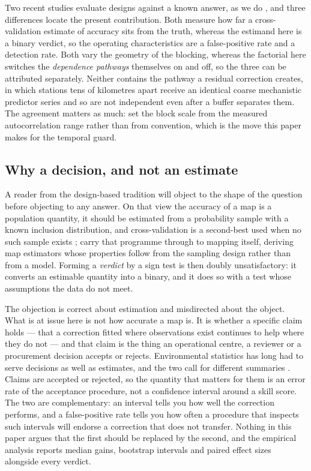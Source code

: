 Two recent studies evaluate designs against a known answer, as we do \citep{stock2025blocks,
koldasbayeva2025stcv}, and three differences locate the present contribution. Both measure how far
a cross-validation estimate of accuracy sits from the truth, whereas the estimand here is a binary
verdict, so the operating characteristics are a false-positive rate and a detection rate. Both vary
the geometry of the blocking, whereas the factorial here switches the \emph{dependence pathways}
themselves on and off, so the three can be attributed separately. Neither contains the pathway a
residual correction creates, in which stations tens of kilometres apart receive an identical coarse
mechanistic predictor series and so are not independent even after a buffer separates them. The
agreement matters as much: \citet{koldasbayeva2025stcv} set the block scale from the measured
autocorrelation range rather than from convention, which is the move this paper makes for the
temporal guard.


\subsection{Why a decision, and not an estimate}

A reader from the design-based tradition will object to the shape of the question before objecting
to any answer. On that view the accuracy of a map is a population quantity, it should be estimated
from a probability sample with a known inclusion distribution, and cross-validation is a
second-best used when no such sample exists \citep{debruin2022clustered,wadoux2021}; \citet{dibiase2022designbased} carry that programme through to mapping itself, deriving map estimators whose properties follow from the sampling design rather than from a model. Forming a
\emph{verdict} by a sign test is then doubly unsatisfactory: it converts an estimable quantity into
a binary, and it does so with a test whose assumptions the data do not meet.

The objection is correct about estimation and misdirected about the object. What is at issue here
is not how accurate a map is. It is whether a specific claim holds --- that a correction fitted
where observations exist continues to help where they do not --- and that claim is the thing an
operational centre, a reviewer or a procurement decision accepts or rejects. Environmental statistics has long had to serve decisions as well as estimates, and the two call for different summaries \citep{cressie2023decisions}. Claims are accepted or
rejected, so the quantity that matters for them is an error rate of the acceptance procedure, not
a confidence interval around a skill score. The two are complementary: an interval tells you how
well the correction performs, and a false-positive rate tells you how often a procedure that
inspects such intervals will endorse a correction that does not transfer. Nothing in this paper
argues that the first should be replaced by the second, and the empirical analysis reports median
gains, bootstrap intervals and paired effect sizes alongside every verdict.

